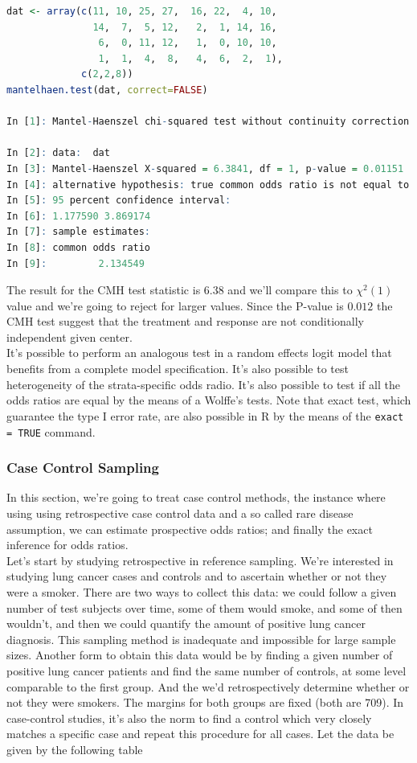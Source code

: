 \documentclass{homework}
\begin{document}
\begin{lstlisting}[language=R]
dat <- array(c(11, 10, 25, 27,  16, 22,  4, 10,
               14,  7,  5, 12,   2,  1, 14, 16,
                6,  0, 11, 12,   1,  0, 10, 10,
                1,  1,  4,  8,   4,  6,  2,  1),
             c(2,2,8))
mantelhaen.test(dat, correct=FALSE)

In [1]: Mantel-Haenszel chi-squared test without continuity correction

In [2]: data:  dat
In [3]: Mantel-Haenszel X-squared = 6.3841, df = 1, p-value = 0.01151
In [4]: alternative hypothesis: true common odds ratio is not equal to 1
In [5]: 95 percent confidence interval:
In [6]: 1.177590 3.869174
In [7]: sample estimates:
In [8]: common odds ratio 
In [9]:         2.134549
\end{lstlisting}

The result for the CMH test statistic is 6.38 and we'll compare this to $\chi^2(1)$ value and we're going to reject for larger values. Since the P-value is $0.012$ the CMH test suggest that the treatment and response are not conditionally independent given center. \\

It's possible to perform an analogous test in a random effects logit model that benefits from a complete model specification. It's also possible to test heterogeneity of the strata-specific odds radio. It's also possible to test if all the odds ratios are equal by the means of a Wolffe's tests. Note that exact test, which guarantee the type I error rate, are also possible in R by the means of the \texttt{exact = TRUE} command. 

\subsubsection{Case Control Sampling}

In this section, we're going to treat case control methods, the instance where using using retrospective case control data and a so called rare disease assumption, we can estimate prospective odds ratios; and finally the exact inference for odds ratios. \\

Let's start by studying retrospective in reference sampling. We're interested in studying lung cancer cases and controls and to ascertain whether or not they were a smoker. There are two ways to collect this data: we could follow a given number of test subjects over time, some of them would smoke, and some of then wouldn't, and then we could quantify the amount of positive lung cancer diagnosis. This sampling method is inadequate and impossible for large sample sizes. Another form to obtain this data would be by finding a given number of positive lung cancer patients and find the same number of controls, at some level comparable to the first group. And the we'd retrospectively determine whether or not they were smokers. The margins for both groups are fixed (both are 709). In case-control studies, it's also the norm to find a control which very closely matches a specific case and repeat this procedure for all cases. 
Let the data be given by the following table
\end{document}
